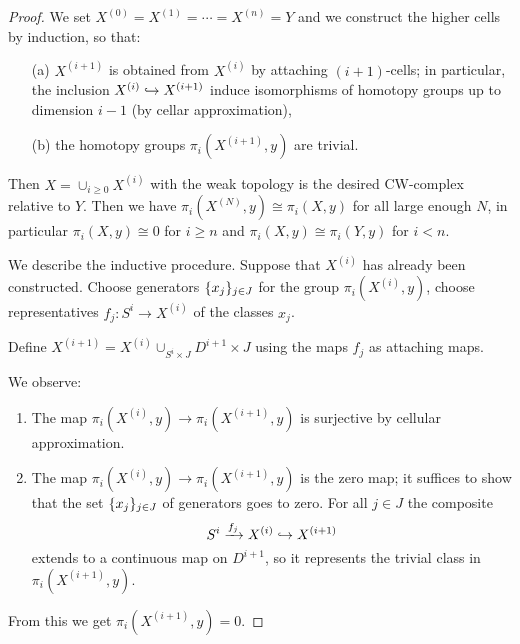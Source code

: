 \begin{proof}
We set $X^{(0)}=X^{(1)}=\cdots=X^{(n)}=Y$ and we construct the higher cells by induction, so that:
\begin{itemize}
    \item[(a)] $X^{(i+1)}$ is obtained from $X^{(i)}$ by attaching $(i+1)$-cells; in particular, the inclusion $X^{(i)}\hookrightarrow X^{(i+1)}$ induce isomorphisms of homotopy groups up to dimension $i-1$ (by cellar approximation),
    \item[(b)] the homotopy groups $\pi_i(X^{(i+1)},y)$ are trivial.
\end{itemize}

Then $X=\cup_{i\geq0}X^{(i)}$ with the weak topology is the desired CW-complex relative to $Y$. Then we have $\pi_i(X^{(N)},y)\cong\pi_i(X,y)$ for all large enough $N$, in particular $\pi_i(X,y)\cong 0$ for $i\geq n$ and $\pi_i(X,y)\cong\pi_i(Y,y)$ for $i<n$.

We describe the inductive procedure. Suppose that $X^{(i)}$ has already been constructed. Choose generators $\{x_j\}_{j\in J}$ for the group $\pi_i(X^{(i)},y)$, choose representatives $f_j:S^i\to X^{(i)}$ of the classes $x_j$.

Define $X^{(i+1)}=X^{(i)}\cup_{S^i\times J}D^{i+1}\times J$ using the maps $f_j$ as attaching maps.

We observe:
\begin{enumerate}
    \item The map $\pi_i(X^{(i)},y)\to\pi_i(X^{(i+1)},y)$ is surjective by cellular approximation.
    \item The map $\pi_i(X^{(i)},y)\to\pi_i(X^{(i+1)},y)$ is the zero map; it suffices to show that the set $\{x_j\}_{j\in J}$ of generators goes to zero. For all $j\in J$ the composite
    \[S^i\xrightarrow{f_j}X^{(i)}\hookrightarrow X^{(i+1)}\]
    extends to a continuous map on $D^{i+1}$, so it represents the trivial class in $\pi_i(X^{(i+1)},y)$.
\end{enumerate}

From this we get $\pi_i(X^{(i+1)},y)=0$.
\end{proof}
